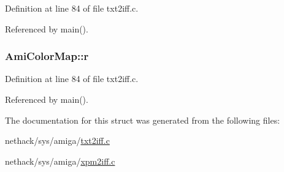 Definition at line 84 of file txt2iff.\+c.



Referenced by main().

\hypertarget{structAmiColorMap_a8b9d73fc2dcbf034454e8d0b56a27a46}{
\subsubsection[{r}]{ Ami\+Color\+Map\+::r}}\label{structAmiColorMap_a8b9d73fc2dcbf034454e8d0b56a27a46}


Definition at line 84 of file txt2iff.\+c.



Referenced by main().



The documentation for this struct was generated from the following files\+:\begin{DoxyCompactItemize}
\item 
nethack/sys/amiga/\hyperlink{txt2iff_8c}{txt2iff.\+c}\item 
nethack/sys/amiga/\hyperlink{xpm2iff_8c}{xpm2iff.\+c}\end{DoxyCompactItemize}
